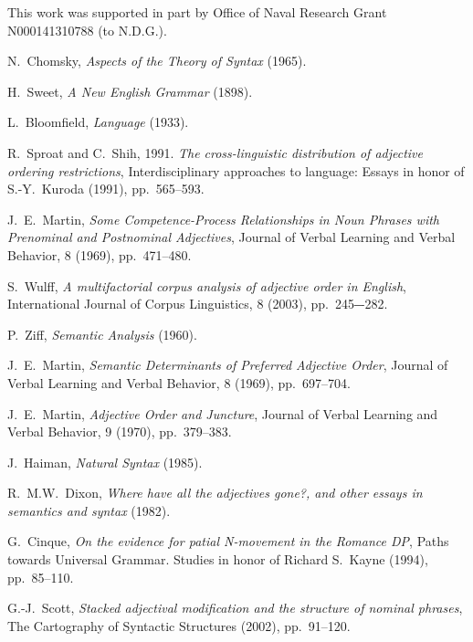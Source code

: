 \documentclass{pnastwo}
\begin{document}
\begin{article}
\begin{materials}
\end{materials}

\begin{acknowledgments}
This work was supported in part by Office of Naval Research Grant N000141310788 (to N.D.G.).
\end{acknowledgments}

\begin{thebibliography}{10}
	N.~Chomsky, {\em Aspects of the Theory of Syntax} (1965).

	H.~Sweet, {\em A New English Grammar} (1898).
	
	L.~Bloomfield, {\em Language} (1933).
	
	R.~Sproat and C.~Shih, 1991. {\em The cross-linguistic distribution of adjective ordering restrictions}, Interdisciplinary approaches to language: Essays in honor of S.-Y.~Kuroda (1991), pp.~565--593.
	
	J.~E.~Martin, {\em Some Competence-Process Relationships in Noun Phrases with Prenominal and Postnominal Adjectives}, Journal of Verbal Learning and Verbal Behavior, 8 (1969), pp.~471--480. 	
	
	S.~Wulff, {\em A multifactorial corpus analysis of adjective order in English},
	International Journal of Corpus Linguistics, 8 (2003), pp.~245‒-282.
	
	P.~Ziff, {\em Semantic Analysis} (1960).
	
	J.~E.~Martin, {\em Semantic Determinants of Preferred Adjective Order}, Journal of Verbal Learning and Verbal Behavior, 8 (1969), pp.~697--704. 
	
	J.~E.~Martin, {\em Adjective Order and Juncture}, Journal of Verbal Learning and Verbal Behavior, 9 (1970), pp.~379--383. 
	
	J.~Haiman, {\em Natural Syntax} (1985).
	
	R.~M.W.~Dixon, {\em Where have all the adjectives gone?, and other essays in semantics and syntax} (1982).
	
	G.~Cinque, {\em On the evidence for patial N-movement in the Romance DP}, Paths towards Universal Grammar. Studies in honor of Richard S.~Kayne (1994), pp.~85--110.
	
	G.-J.~Scott, {\em Stacked adjectival modification and the structure of nominal phrases}, The Cartography of Syntactic Structures (2002), pp.~91--120.
	

\end{thebibliography}
\end{article}
\end{document}
